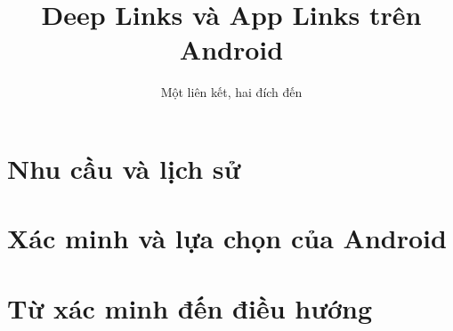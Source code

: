 \documentclass[aspectratio=169,10pt,xcolor=table]{beamer}
\title{Deep Links và App Links trên Android}
\subtitle{Một liên kết, hai đích đến}
\author{\SeminarTeam}
\begin{document}
\section{Nhu cầu và lịch sử}

\section{Xác minh và lựa chọn của Android}

\section{Từ xác minh đến điều hướng}

\end{document}
